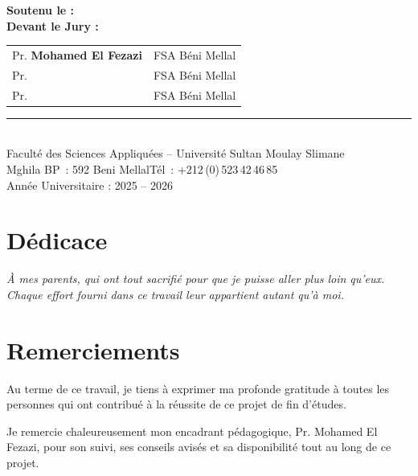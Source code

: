 \documentclass[12pt,a4paper]{report}
\begin{document}
\begin{titlepage}
\begin{center}
\vspace{0.5cm}
\begin{flushleft}
  \textbf{Soutenu le :} \dotfill\\[4pt]
  \textbf{Devant le Jury :}\\[0.2cm]
  \begin{tabular}{ll}
    Pr. \textbf{Mohamed El Fezazi} & FSA Béni Mellal \\[3pt]
    Pr. \dotfill & FSA Béni Mellal \\[3pt]
    Pr. \dotfill & FSA Béni Mellal \\
  \end{tabular}
\end{flushleft}
\vfill
\rule{0.3\linewidth}{0.5pt}\\[0.2cm]
{\small Faculté des Sciences Appliquées -- Université Sultan Moulay Slimane\\
Mghila BP~: 592 Beni Mellal\quad Tél~: +212\,(0)\,523\,42\,46\,85}\\[4pt]
{\small Année Universitaire : 2025 -- 2026}
\end{center}
\end{titlepage}
\restoregeometry

\clearpage{}\setcounter{page}{1}

\chapter*{Dédicace}
\vspace*{3cm}
\begin{center}
\itshape\large
À mes parents, qui ont tout sacrifié pour que je puisse
aller plus loin qu'eux.\\[0.5cm]
Chaque effort fourni dans ce travail leur appartient
autant qu'à moi.
\end{center}

\newpage
\chapter*{Remerciements}

Au terme de ce travail, je tiens à exprimer ma profonde
gratitude à toutes les personnes qui ont contribué à la
réussite de ce projet de fin d'études.

Je remercie chaleureusement mon encadrant pédagogique,
Pr. Mohamed El Fezazi, pour son suivi, ses conseils avisés
et sa disponibilité tout au long de ce projet.
\end{document}
